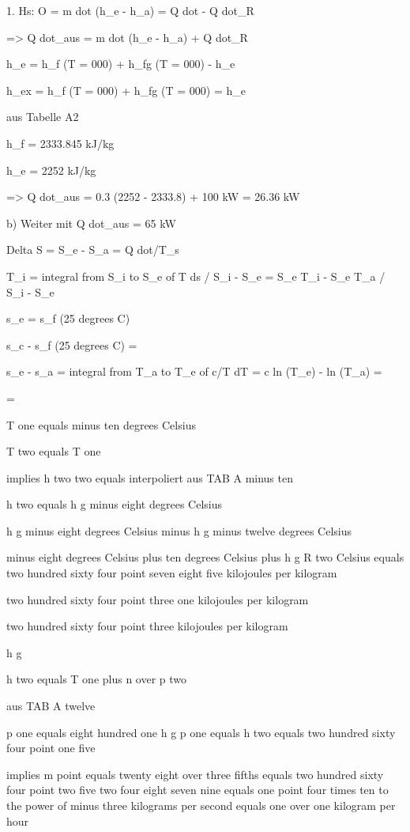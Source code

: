 1. Hs: O = m dot (h_e - h_a) = Q dot - Q dot_R

=> Q dot_aus = m dot (h_e - h_a) + Q dot_R

h_e = h_f (T = 000) + h_fg (T = 000) - h_e

h_ex = h_f (T = 000) + h_fg (T = 000) = h_e

aus Tabelle A2

h_f = 2333.845 kJ/kg

h_e = 2252 kJ/kg

=> Q dot_aus = 0.3 (2252 - 2333.8) + 100 kW = 26.36 kW

b) Weiter mit Q dot_aus = 65 kW

Delta S = S_e - S_a = Q dot/T_s

T_i = integral from S_i to S_e of T ds / S_i - S_e = S_e T_i - S_e T_a / S_i - S_e

s_e = s_f (25 degrees C)

s_c - s_f (25 degrees C) =

s_e - s_a = integral from T_a to T_e of c/T dT = c ln (T_e) - ln (T_a) =

=

T one equals minus ten degrees Celsius

T two equals T one

implies h two two equals interpoliert aus TAB A minus ten

h two equals h g minus eight degrees Celsius

h g minus eight degrees Celsius minus h g minus twelve degrees Celsius

minus eight degrees Celsius plus ten degrees Celsius plus h g R two Celsius equals two hundred sixty four point seven eight five kilojoules per kilogram

two hundred sixty four point three one kilojoules per kilogram

two hundred sixty four point three kilojoules per kilogram

h g

h two equals T one plus n over p two

aus TAB A twelve

p one equals eight hundred one h g p one equals h two equals two hundred sixty four point one five

implies m point equals twenty eight over three fifths equals two hundred sixty four point two five two four eight seven nine equals one point four times ten to the power of minus three kilograms per second equals one over one kilogram per hour

